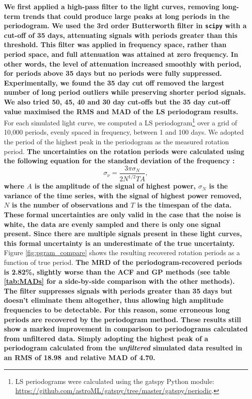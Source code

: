 \documentclass[a4paper,fleqn,usenatbib,useAMS]{mnras}
\newcommand{\oldpgramRMS}{18.98}
\newcommand{\oldpercentpgramMAD}{4.70}
\newcommand{\percentpgramMAD}{2.82}
\begin{document}
{\bf We first applied a high-pass filter to the light curves, removing
long-term trends that could produce large peaks at long periods in the
periodogram.
We used the 3rd order Butterworth filter in {\tt scipy} with a cut-off
of 35 days, attenuating signals with periods greater than this threshold.
This filter was applied in frequency space, rather than period space, and full
attenuation was attained at zero frequency.
In other words, the level of attenuation increased smoothly with period, for
periods above 35 days but no periods were fully suppressed.
Experimentally, we found the 35 day cut off removed the largest number of long
period outliers while preserving shorter period signals.
We also tried 50, 45, 40 and 30 day cut-offs but the 35 day cut-off value
maximised the RMS and MAD of the LS periodogram results.}
For each simulated light curve, we computed a LS periodogram\footnote{LS
periodograms were calculated using the gatspy Python module:
\url{https://github.com/astroML/gatspy/tree/master/gatspy/periodic}.} over a
grid of 10,000 periods, evenly spaced in frequency, between 1 and 100 days.
We adopted the period of the highest peak in the periodogram as the measured
rotation period.
{\bf The uncertainties on the rotation periods were calculated using the
following equation for the standard deviation of the frequency
\citep{Horne1986, Kovacs1981}:
\begin{equation}
    \sigma_{\nu} = \frac{3\pi\sigma_N}{2N^{1/2}TA},
\end{equation}
where $A$ is the amplitude of the signal of highest power, $\sigma_N$ is the
variance of the time series, with the signal of highest power removed, $N$
is the number of observations and $T$ is the timespan of the data.
These formal uncertainties are only valid in the case that the noise is white,
the data are evenly sampled and there is only one signal present.
Since there are multiple signals present in these light curves, this formal
uncertainty is an underestimate of the true uncertainty.
}
Figure \ref{fig:pgram_compare} shows the resulting recovered rotation periods
as a function of true period.
{\bf The MRD of the periodogram-recovered periods is \percentpgramMAD\%,
slightly worse than the ACF and GP methods (see table \ref{tab:MADs} for
a side-by-side comparison with the other methods).
The filter suppresses signals with periods greater than 35 days but doesn't
eliminate them altogether, thus allowing high amplitude frequencies to be
detectable.
For this reason, some erroneous long periods are recovered by the periodogram
method.
These results still show a marked improvement in comparison to periodograms
calculated from unfiltered data.
Simply adopting the highest peak of a periodogram calculated from the {\it
unfiltered} simulated data resulted in an RMS of \oldpgramRMS\ and relative
MAD of \oldpercentpgramMAD.}
\end{document}
